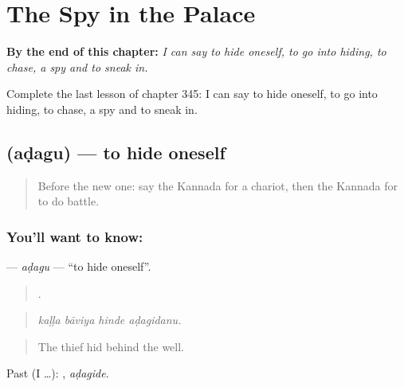
\chapter{The Spy in the Palace}
\label{ch:ka-the-spy-in-the-palace}

\begin{chapteropening}
\textbf{By the end of this chapter:} \emph{I can say to hide oneself, to go into hiding, to chase, a spy and to sneak in.}

Complete the last lesson of chapter 345: I can say to hide oneself, to go into hiding, to chase, a spy and to sneak in.
\end{chapteropening}

\section[\texorpdfstring{\kn{ಅಡಗು} (aḍagu)}{ಅಡಗು (aḍagu)}]{ (aḍagu) — to hide oneself}

\label{lesson:KA-C345-adagu}



\begin{quote}
Before the new one: say the Kannada for a chariot, then the Kannada for to do battle.
\end{quote}

\subsection*{You'll want to know: }
\textbf{} — \emph{aḍagu} — \textquotedblleft{}to hide oneself\textquotedblright{}.

\begin{quote}
   .
\end{quote}

\begin{quote}
\emph{kaḷḷa bāviya hinde aḍagidanu.}
\end{quote}

\begin{quote}
The thief hid behind the well.
\end{quote}

Past (I …): , \emph{aḍagide}.

